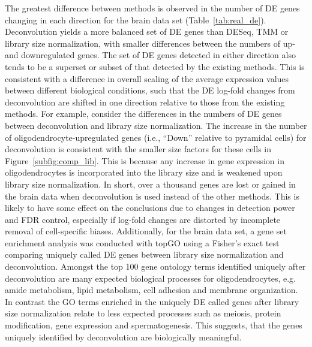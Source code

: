\documentclass{article}
\begin{document}
The greatest difference between methods is observed in the number of DE genes changing in each direction for the brain data set (Table~\ref{tab:real_de}).
Deconvolution yields a more balanced set of DE genes than DESeq, TMM or library size normalization, with smaller differences between the numbers of up- and downregulated genes.
The set of DE genes detected in either direction also tends to be a superset or subset of that detected by the existing methods.
This is consistent with a difference in overall scaling of the average expression values between different biological conditions, 
    such that the DE log-fold changes from deconvolution are shifted in one direction relative to those from the existing methods.
For example, consider the differences in the numbers of DE genes between deconvolution and library size normalization.
The increase in the number of oligodendrocyte-upregulated genes (i.e., ``Down'' relative to pyramidal cells) for deconvolution is consistent with the smaller size factors for these cells in Figure~\ref{subfig:comp_lib}.
This is because any increase in gene expression in oligodendrocytes is incorporated into the library size and is weakened upon library size normalization.
In short, over a thousand genes are lost or gained in the brain data when deconvolution is used instead of the other methods.
This is likely to have some effect on the conclusions due to changes in detection power and FDR control, 
    especially if log-fold changes are distorted by incomplete removal of cell-specific biases.
Additionally, for the brain data set, a gene set enrichment analysis was conducted with topGO \cite{topGO} using a Fisher's exact test comparing uniquely called DE genes between library size normalization and deconvolution. 
Amongst the top 100 gene ontology terms identified uniquely after deconvolution are many expected biological processes for oligodendrocytes, e.g. amide metabolism, lipid metabolism, cell adhesion and membrane organization.
In contrast the GO terms enriched in the uniquely DE called genes after library size normalization relate to less expected processes such as meiosis, protein modification, gene expression and spermatogenesis.
This suggests, that the genes uniquely identified by deconvolution are biologically meaningful.
\end{document}
